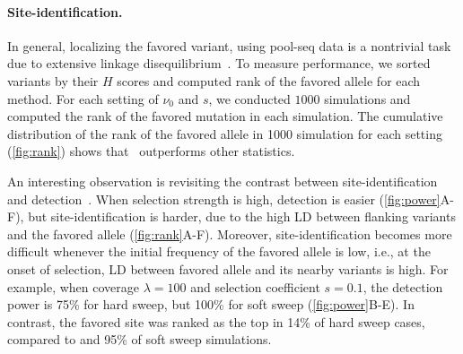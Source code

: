 \paragraph{Site-identification.}
In general, localizing the favored variant, using pool-seq data is a
nontrivial task due to extensive linkage
disequilibrium~\cite{tobler2014massive}.  To measure performance, we
sorted variants by their $H$ scores and computed rank of the favored
allele for each method. For each setting of $\nu_0$ and $s$, we
conducted $1000$ simulations and computed the rank of the favored
mutation in each simulation. The cumulative distribution of the rank
of the favored allele in 1000 simulation for each setting
(\ref{fig:rank}) shows that \comale\ outperforms other statistics.

An interesting observation is revisiting the contrast between
site-identification and
detection~\cite{long2013massive,tobler2014massive}.  When selection
strength is high, detection is easier (\ref{fig:power}A-F), but
site-identification is harder, due to the high LD between flanking
variants and the favored allele (\ref{fig:rank}A-F).  Moreover,
site-identification becomes more difficult whenever the initial
frequency of the favored allele is low, i.e., at the onset of
selection, LD between favored allele and its nearby variants is
high. For example, when coverage $\lambda=100$ and selection
coefficient $s=0.1$, the detection power is 75\% for hard sweep, but
100\% for soft sweep (\ref{fig:power}B-E). In contrast, the favored
site was ranked as the top in 14\% of hard sweep cases, compared to
and 95\% of soft sweep simulations.   
